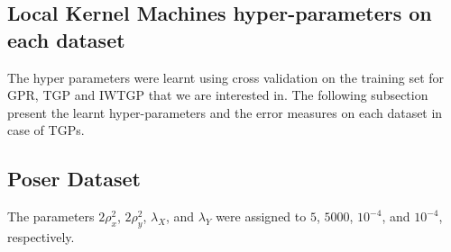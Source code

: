 \begin{appendices}
%
%
%
%
%



\section{Local Kernel Machines hyper-parameters on each dataset}
The hyper parameters were learnt using cross validation on the training set for  GPR, TGP and IWTGP that we are interested in. The following subsection present the learnt hyper-parameters and the error measures on each dataset in case of TGPs.
\subsection{Poser Dataset}
The parameters $2 \rho_x^2$, $2 \rho_y^2$, $\lambda_X$, and $\lambda_Y$ were assigned to  $5$, $5000$, $10^{-4}$, and $10^{-4}$, respectively. 


\end{appendices}
